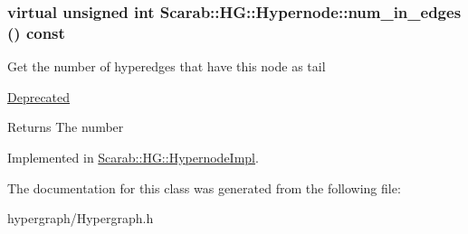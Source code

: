 \hypertarget{classScarab_1_1HG_1_1Hypernode_a4b1a4ffaa8a8b0295763673e6d86d693}{
\subsubsection[{num\_\-in\_\-edges}]{\setlength{\rightskip}{0pt plus 5cm}virtual unsigned int Scarab::HG::Hypernode::num\_\-in\_\-edges () const}}
\label{classScarab_1_1HG_1_1Hypernode_a4b1a4ffaa8a8b0295763673e6d86d693}
Get the number of hyperedges that have this node as tail \begin{Desc}
\item[\hyperlink{deprecated__deprecated000008}{Deprecated}]\end{Desc}
\begin{DoxyReturn}{Returns}
The number 
\end{DoxyReturn}


Implemented in \hyperlink{classScarab_1_1HG_1_1HypernodeImpl_a9a13a37fcece16603ec4bf3f364e6fcc}{Scarab::HG::HypernodeImpl}.



The documentation for this class was generated from the following file:\begin{DoxyCompactItemize}
\item 
hypergraph/Hypergraph.h\end{DoxyCompactItemize}
